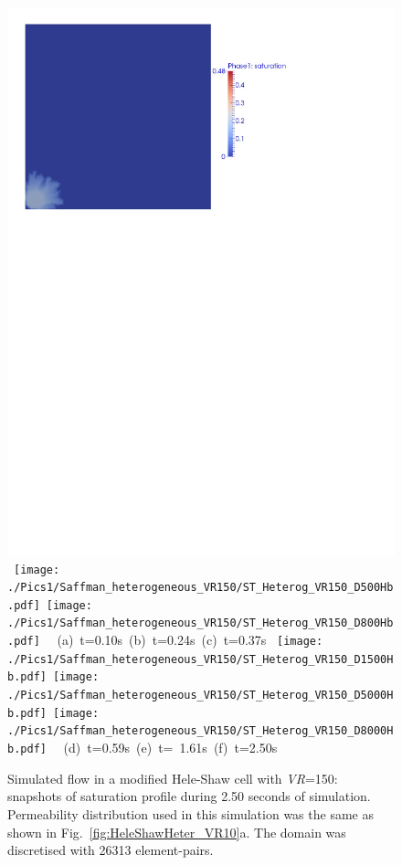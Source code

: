 \begin{landscape}
  \begin{figure}[ht]
  \vbox{\vspace{-.5cm}
      \hbox{\includegraphics[width=.65\textwidth]{./Pics1/Saffman_heterogeneous_VR150/ST_Heterog_VR150_D200Hbcd.pdf} 
            \texttt{[image: ./Pics1/Saffman\_heterogeneous\_VR150/ST\_Heterog\_VR150\_D500Hb.pdf]}
            \texttt{[image: ./Pics1/Saffman\_heterogeneous\_VR150/ST\_Heterog\_VR150\_D800Hb.pdf]} }
      \hbox{\hspace{2.0cm} (a) t=0.10s \hspace{6.cm} (b) t=0.24s \hspace{4.cm} (c) t=0.37s}
      \vspace{0.5cm}
      \hbox{\hspace{.5cm} \texttt{[image: ./Pics1/Saffman\_heterogeneous\_VR150/ST\_Heterog\_VR150\_D1500Hb.pdf]}
            \texttt{[image: ./Pics1/Saffman\_heterogeneous\_VR150/ST\_Heterog\_VR150\_D5000Hb.pdf]}
            \texttt{[image: ./Pics1/Saffman\_heterogeneous\_VR150/ST\_Heterog\_VR150\_D8000Hb.pdf]} }
      \hbox{\hspace{3.cm} (d) t=0.59s \hspace{3.cm} (e) t= 1.61s\hspace{4.cm} (f) t=2.50s }}
\caption{Simulated flow in a modified Hele-Shaw cell with {\it VR}=150: snapshots of saturation profile during 2.50 seconds of simulation. Permeability distribution used in this simulation was the same as shown in Fig.~\ref{fig:HeleShawHeter_VR10}a. The domain was discretised with 26313  element-pairs.}
\label{fig:HeleShawHeter_VR150}
\end{figure}
\end{landscape}
\clearpage



